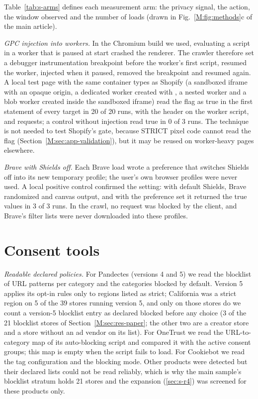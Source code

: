 \documentclass[preprint,11pt,authoryear,a4paper]{elsarticle}
\begin{document}
Table~\ref{tab:s-arms} defines each measurement arm: the privacy signal, the action, the window observed and the number of loads (drawn in Fig.~\ref*{M:fig:methods}c of the main article).



\emph{GPC injection into workers.} In the Chromium build we used, evaluating a script in a worker that is paused at start crashed the renderer. The crawler therefore set a debugger instrumentation breakpoint before the worker's first script, resumed the worker, injected  when it paused, removed the breakpoint and resumed again. A local test page with the same container types as Shopify (a sandboxed iframe with an opaque origin, a dedicated worker created with , a nested worker and a blob worker created inside the sandboxed iframe) read the flag as true in the first statement of every target in 20 of 20 runs, with the  header on the worker script,  and  requests; a control without injection read true in 0 of 3 runs. The technique is not needed to test Shopify's gate, because STRICT pixel code cannot read the flag (Section~\ref*{M:sec:app-validation}), but it may be reused on worker-heavy pages elsewhere.

\emph{Brave with Shields off.} Each Brave load wrote a preference that switches Shields off into its new temporary profile; the user's own browser profiles were never used. A local positive control confirmed the setting: with default Shields, Brave randomized  and canvas output, and with the preference set it returned the true values in 3 of 3 runs. In the crawl, no request was blocked by the client, and Brave's filter lists were never downloaded into these profiles.

\section{Consent tools}\label{sec:s-cmp}

\emph{Readable declared policies.} For Pandectes (versions 4 and 5) we read the blocklist of URL patterns per category and the categories blocked by default. Version 5 applies its opt-in rules only to regions listed as strict; California was a strict region on 5 of the 39 stores running version 5, and only on those stores do we count a version-5 blocklist entry as declared blocked before any choice (3 of the 21 blocklist stores of Section~\ref*{M:sec:res-paper}; the other two are a creator store and a store without an ad vendor on its list). For OneTrust we read the URL-to-category map of its auto-blocking script and compared it with the active consent groups; this map is empty when the script fails to load. For Cookiebot we read the tag configuration and the blocking mode. Other products were detected but their declared lists could not be read reliably, which is why the main sample's blocklist stratum holds 21 stores and the expansion (\ref{sec:s-r4}) was screened for these products only.
\end{document}
